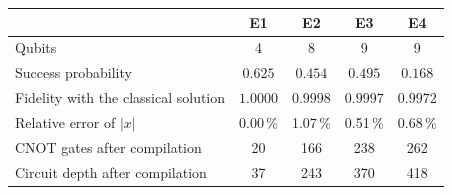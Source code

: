 \begin{tabular}{lcccc}
\toprule
 & E1 & E2 & E3 & E4 \\
\midrule
Qubits & 4 & 8 & 9 & 9 \\
Success probability & $0.625$ & $0.454$ & $0.495$ & $0.168$ \\
Fidelity with the classical solution & $1.0000$ & $0.9998$ & $0.9997$ & $0.9972$ \\
Relative error of $|x|$ & 0.00\,\% & 1.07\,\% & 0.51\,\% & 0.68\,\% \\
CNOT gates after compilation & 20 & 166 & 238 & 262 \\
Circuit depth after compilation & 37 & 243 & 370 & 418 \\
\bottomrule
\end{tabular}
